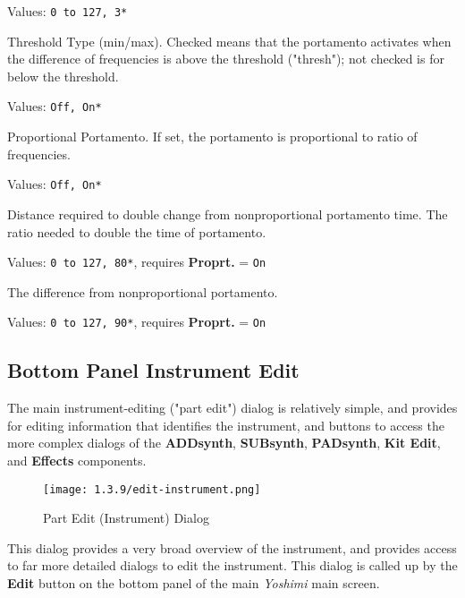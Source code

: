    Values: \texttt{0 to 127, 3*}

   Threshold Type (min/max).
   Checked means that the portamento activates when the difference of
   frequencies is above the threshold ("thresh"); not checked is for below
   the threshold.

   Values: \texttt{Off, On*}

   Proportional Portamento.
   If set, the portamento is proportional to ratio of frequencies.

   Values: \texttt{Off, On*}

   Distance required to double change from nonproportional
   portamento time.
   The ratio needed to double the time of portamento.

   Values: \texttt{0 to 127, 80*}, requires \textbf{Proprt.} = \texttt{On}

   The difference from nonproportional portamento.

   Values: \texttt{0 to 127, 90*}, requires \textbf{Proprt.} = \texttt{On}

\subsection{Bottom Panel Instrument Edit}
\label{subsec:bottom_panel_instrument_edit}

   The main instrument-editing ("part edit")
   dialog is relatively simple, and provides for
   editing information that identifies the instrument, and buttons to access
   the more complex dialogs of the
   \textbf{ADDsynth}, \textbf{SUBsynth}, \textbf{PADsynth}, \textbf{Kit Edit},
   and \textbf{Effects} components.


\begin{figure}[H]
   \centering 
   \texttt{[image: 1.3.9/edit-instrument.png]}
   \caption{Part Edit (Instrument) Dialog}
   \label{fig:instrument_edit_dialog}
\end{figure}

   This dialog provides a very broad overview of the instrument, and
   provides access to far more detailed dialogs to edit the instrument.
   This dialog is called up by the \textbf{Edit} button on the bottom panel
   of the main \textsl{Yoshimi} main screen.

